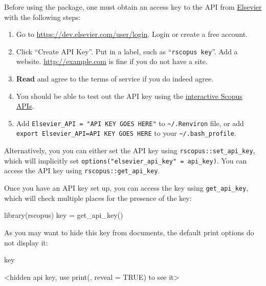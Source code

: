 Before using the package, one must obtain an access key to the API from
\href{https://dev.elsevier.com/apikey/manage}{Elsevier} with the
following steps:

\begin{enumerate}
\def\labelenumi{\arabic{enumi}.}
\tightlist
\item
  Go to \url{https://dev.elsevier.com/user/login}. Login or create a
  free account.
\item
  Click ``Create API Key''. Put in a label, such as
  ``\texttt{rscopus\ key}''. Add a website. \url{http://example.com} is
  fine if you do not have a site.
\item
  \textbf{Read} and agree to the terms of service if you do indeed
  agree.
\item
  You should be able to test out the API key using the
  \href{https://dev.elsevier.com/scopus.html}{interactive Scopus APIs}.
\item
  Add \texttt{Elsevier\_API\ =\ "API\ KEY\ GOES\ HERE"} to
  \texttt{\textasciitilde{}/.Renviron} file, or add
  \texttt{export\ Elsevier\_API=API\ KEY\ GOES\ HERE} to your
  \texttt{\textasciitilde{}/.bash\_profile}.
\end{enumerate}

Alternatively, you you can either set the API key using
\texttt{rscopus::set\_api\_key}, which will implicitly set
\texttt{options("elsevier\_api\_key"\ =\ api\_key)}. You can access the
API key using \texttt{rscopus::get\_api\_key}.

Once you have an API key set up, you can access the key using
\texttt{get\_api\_key}, which will check multiple places for the
presence of the key:

\begin{Schunk}
\begin{Sinput}
library(rscopus)
key = get_api_key()
\end{Sinput}
\end{Schunk}

As you may want to hide this key from documents, the default print
options do not display it:

\begin{Schunk}
\begin{Sinput}
key
\end{Sinput}
\begin{Soutput}
<hidden api key, use print(, reveal = TRUE) to see it>
\end{Soutput}
\end{Schunk}

